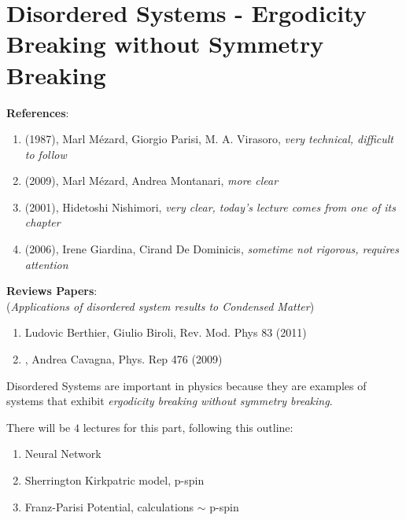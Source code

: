 \documentclass[../template.tex]{subfiles}
\begin{document}
\section{Disordered Systems - Ergodicity Breaking without Symmetry Breaking}

\textbf{References}:
\begin{enumerate}
    \item {} (1987), Marl Mézard, Giorgio Parisi, M. A. Virasoro, \textit{very technical, difficult to follow} 
    \item {} (2009), Marl Mézard, Andrea Montanari, \textit{more clear} 
    \item {} (2001), Hidetoshi Nishimori, \textit{very clear, today's lecture comes from one of its chapter} 
    \item {} (2006), Irene Giardina, Cirand De Dominicis, \textit{sometime not rigorous, requires attention} 
\end{enumerate}
\textbf{Reviews Papers}:\\
(\textit{Applications of disordered system results to Condensed Matter})
\begin{enumerate}
    \item {} Ludovic Berthier, Giulio Biroli, Rev. Mod. Phys 83 (2011)
    \item {}, Andrea Cavagna, Phys. Rep 476 (2009)
\end{enumerate} 


Disordered Systems are important in physics because they are examples of systems that exhibit \textit{ergodicity breaking without symmetry breaking}.  

There will be $4$ lectures for this part, following this outline:
\begin{enumerate}
    \item Neural Network
    \item Sherrington Kirkpatric model, p-spin
    \item Franz-Parisi Potential, calculations $\sim$ p-spin 
\end{enumerate}
\end{document}
